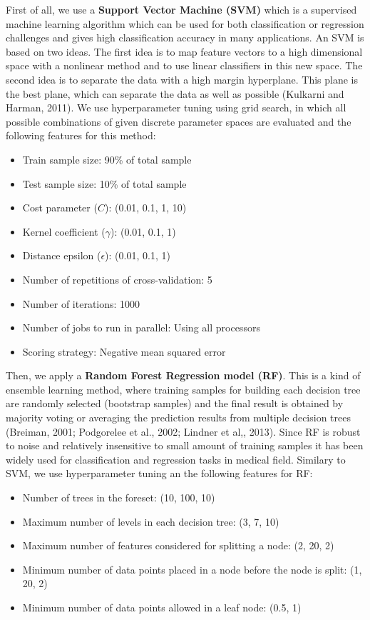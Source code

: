 \documentclass[12pt]{article}
\begin{document}
First of all, we use a \textbf{Support Vector Machine (SVM)} which is a supervised machine learning algorithm which can be used for both classification or regression challenges and gives high classification accuracy in many applications. An SVM is based on two ideas. The first idea is to map feature vectors to a high dimensional space with a nonlinear method and to use linear classifiers in this new space. The second idea is to separate the data with a high margin hyperplane. This plane is the best plane, which can separate the data as well as possible (Kulkarni and Harman, 2011). We use hyperparameter tuning using grid search, in which all possible combinations of given discrete parameter spaces are evaluated and the following features for this method:
\begin{itemize}
\setlength\itemsep{0.01em}
\item Train sample size: 90\% of total sample
\item Test sample size: 10\% of total sample
\item Cost parameter ($C$): (0.01, 0.1, 1, 10)
\item Kernel coefficient ($\gamma$): (0.01, 0.1, 1)
\item Distance epsilon ($\epsilon$): (0.01, 0.1, 1)
\item Number of repetitions of cross-validation: 5
\item Number of iterations: 1000
\item Number of jobs to run in parallel: Using all processors
\item Scoring strategy: Negative mean squared error
\end{itemize}

Then, we apply a \textbf{Random Forest Regression model (RF)}. This is a kind of ensemble learning method, where training samples for building each decision tree are randomly selected (bootstrap samples) and the final result is obtained by majority voting or averaging the prediction results from multiple decision trees (Breiman, 2001; Podgorelee et al., 2002; Lindner et al,, 2013). Since RF is robust to noise and relatively insensitive to small amount of training samples it has been widely used for classification and regression tasks in medical field. Similary to SVM, we use hyperparameter tuning an the following features for RF:
\begin{itemize}
\setlength\itemsep{0.01em}
\item Number of trees in the foreset: (10, 100, 10)
\item Maximum number of levels in each decision tree: (3, 7, 10)
\item Maximum number of features considered for splitting a node: (2, 20, 2)
\item Minimum number of data points placed in a node before the node is split: (1, 20, 2)
\item Minimum number of data points allowed in a leaf node: (0.5, 1)
\end{itemize}
\end{document}
